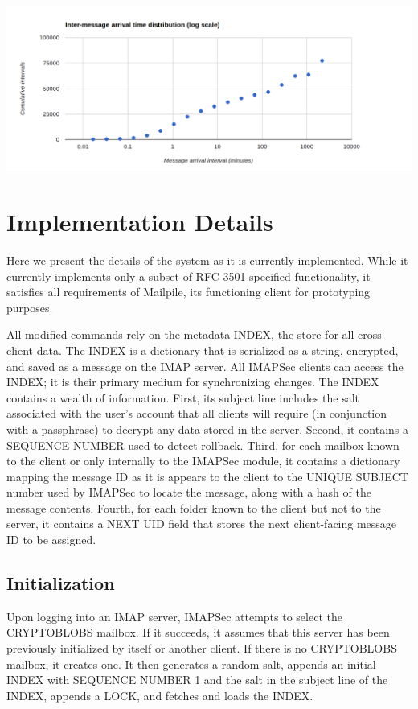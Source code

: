 \documentclass[pageno]{jpaper}
\newcommand{\project}{IMAPSec }
\begin{document}
\includegraphics[width=\textwidth]{intermessagelog}




\section{Implementation Details}

Here we present the details of the system as it is currently implemented. While it currently implements only a subset of RFC 3501-specified functionality, it satisfies all requirements of Mailpile, its functioning client for prototyping purposes.

All modified commands rely on the metadata INDEX, the store for all cross-client data. The INDEX is a dictionary that is serialized as a string, encrypted, and saved as a message on the IMAP server. All \project clients can access the INDEX; it is their primary medium for synchronizing changes. The INDEX contains a wealth of information. First, its subject line includes the salt associated with the user's account that all clients will require (in conjunction with a passphrase) to decrypt any data stored in the server. Second, it contains a SEQUENCE NUMBER used to detect rollback. Third, for each mailbox known to the client or only internally to the \project module, it contains a dictionary mapping the message ID as it is appears to the client to the UNIQUE SUBJECT number used by \project to locate the message, along with a hash of the message contents. Fourth, for each folder known to the client but not to the server, it contains a NEXT UID field that stores the next client-facing message ID to be assigned.

\subsection{Initialization}
\label{initialization}

Upon logging into an IMAP server, \project attempts to select the CRYPTOBLOBS mailbox. If it succeeds, it assumes that this server has been previously initialized by itself or another client. If there is no CRYPTOBLOBS mailbox, it creates one. It then generates a random salt, appends an initial INDEX with SEQUENCE NUMBER 1 and the salt in the subject line of the INDEX, appends a LOCK, and fetches and loads the INDEX.
\end{document}
